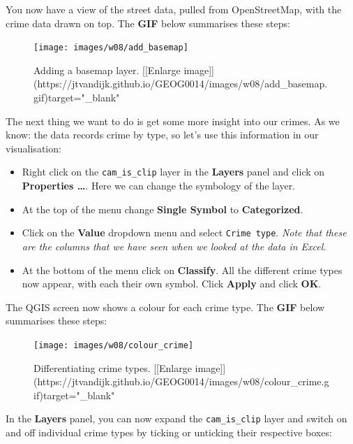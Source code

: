 \documentclass[
]{book}
\providecommand{\tightlist}{%
  \setlength{\itemsep}{0pt}\setlength{\parskip}{0pt}}
\begin{document}
You now have a view of the street data, pulled from OpenStreetMap, with the crime data drawn on top. The \textbf{GIF} below summarises these steps:

\begin{figure}

{\centering \texttt{[image: images/w08/add\_basemap]} 

}

\caption{Adding a basemap layer. [[Enlarge image]](https://jtvandijk.github.io/GEOG0014/images/w08/add_basemap.gif){target="_blank"}}\label{fig:adding-basemap}
\end{figure}

The next thing we want to do is get some more insight into our crimes. As we know: the data records crime by type, so let's use this information in our visualisation:

\begin{itemize}
\tightlist
\item
  Right click on the \texttt{cam\_is\_clip} layer in the \textbf{Layers} panel and click on \textbf{Properties \ldots{}}. Here we can change the symbology of the layer.
\item
  At the top of the menu change \textbf{Single Symbol} to \textbf{Categorized}.
\item
  Click on the \textbf{Value} dropdown menu and select \texttt{Crime\ type}. \emph{Note that these are the columns that we have seen when we looked at the data in Excel.}
\item
  At the bottom of the menu click on \textbf{Classify}. All the different crime types now appear, with each their own symbol. Click \textbf{Apply} and click \textbf{OK}.
\end{itemize}

The QGIS screen now shows a colour for each crime type. The \textbf{GIF} below summarises these steps:

\begin{figure}

{\centering \texttt{[image: images/w08/colour\_crime]} 

}

\caption{Differentiating crime types. [[Enlarge image]](https://jtvandijk.github.io/GEOG0014/images/w08/colour_crime.gif){target="_blank"}}\label{fig:colour-crimes}
\end{figure}

In the \textbf{Layers} panel, you can now expand the \texttt{cam\_is\_clip} layer and switch on and off individual crime types by ticking or unticking their respective boxes:
\end{document}
